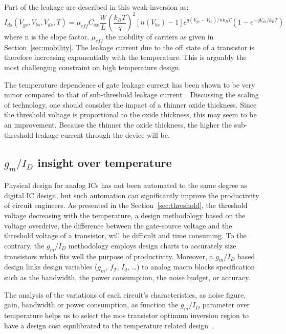 Part of the leakage are described in this weak-inversion as:
\begin{equation}
\label{eqn:ids_leakage}
I_{ds}(V_{gs}, V_{bs}, V_{ds}, T) = \mu_{eff} C_{ox} \frac{W}{L} {\left(\frac{k_B T}{q}\right)}^2 [n(V_{bs})-1] e^{q(V_{gs}-V_{th})/nk_B T} \left(1-e^{-qV_{ds}/k_B T} \right)
\end{equation}
where n is the slope factor, \(\mu_{eff} \) the mobility of carriers as given in Section~\ref{sec:mobility}. The leakage current due to the off state of a transistor is therefore increasing exponentially with the temperature. This is arguably the most challenging constraint on high temperature design.

The temperature dependence of gate leakage current has been shown to be very minor compared to that of sub-threshold leakage current~\cite{Agarwal2006}. Discussing the scaling of technology, one should consider the impact of a thinner oxide thickness. Since the threshold voltage is proportional to the oxide thickness, this may seem to be an improvement. Because the thinner the oxide thickness, the higher the sub-threshold leakage current through the device will be.

\subsection{\(g_m/I_{D} \) insight over temperature} %
\label{sec:analog-insight}
Physical design for analog ICs has not been automated to the same degree
as digital IC design, but such automation can significantly improve the productivity of circuit engineers. As presented in the Section~\ref{sec:threshold}, the threshold voltage decreasing with the temperature,  a design methodology based on the voltage overdrive, the difference between the gate-source voltage and the threshold voltage of a transistor, will be difficult and time consuming. To the contrary, the \(g_m/I_{D} \) methodology employs design charts to accurately size transistors which fits well the purpose of productivity. Moreover, a \(g_m/I_{D} \)  based design links design variables (\(g_m \), \(f_T \), \(I_d \), \ldots) to analog macro blocks specification such as the bandwidth, the power consumption, the noise budget, or accuracy.

The analysis of the variations of each circuit's characteristics, as noise figure, gain, bandwidth or power consumption, as function the \(g_m/I_{D} \) parameter over temperature helps us to select the mos transistor optimum inversion region to have a design cost equilibrated to the temperature related design~\cite{Shoucair1986, Silveira1996, Girardi2006, Zhang2017}.

